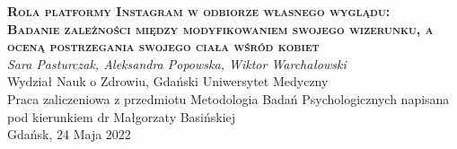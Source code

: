 \documentclass[12pt,a4paper,final,oneside,onecolumn,titlepage]{article}
\begin{document}
\pagestyle{fancy}
\lhead{\thepage}

\begin{titlepage}
  \thispagestyle{empty}
  \begin{center}
  \vspace*{1cm}
  \Large
  \textbf{\textsc{Rola platformy Instagram w odbiorze własnego wyglądu:\\ Badanie zależności między modyfikowaniem swojego wizerunku, a oceną postrzegania swojego ciała wśród kobiet\\}}
  \vspace{1.5cm}
  \textit{Sara Pasturczak, Aleksandra Popowska, Wiktor Warchałowski\\}
  Wydział Nauk o Zdrowiu, Gdański Uniwersytet Medyczny\\
  \vspace{3cm}
  Praca zaliczeniowa z przedmiotu Metodologia Badań Psychologicznych napisana pod kierunkiem dr Małgorzaty Basińskiej\\
  \vspace{3cm}
  Gdańsk, 24 Maja 2022
  \end{center}
\end{titlepage}
\end{document}
